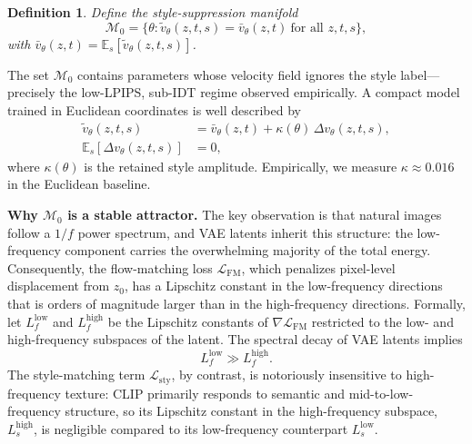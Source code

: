 \documentclass[letterpaper]{article}
\newtheorem{definition}{Definition}
\begin{document}
\begin{definition}
\label{def:attractor}
Define the style-suppression manifold
\begin{equation}
\mathcal M_0 = \{\theta:\tilde v_\theta(z,t,s)=\bar v_\theta(z,t)\ \text{for all } z,t,s\},
\end{equation}
with $\bar v_\theta(z,t)=\mathbb E_s[\tilde v_\theta(z,t,s)]$.
\end{definition}

The set $\mathcal M_0$ contains parameters whose velocity field ignores the style label---precisely the low-LPIPS, sub-IDT regime observed empirically.
A compact model trained in Euclidean coordinates is well described by
\begin{equation}
\begin{aligned}
\tilde v_\theta(z,t,s) &= \bar v_\theta(z,t) + \kappa(\theta)\,\Delta v_\theta(z,t,s),\\
\mathbb E_s[\Delta v_\theta(z,t,s)] &= 0,
\end{aligned}
\label{eq:kappa}
\end{equation}
where $\kappa(\theta)$ is the retained style amplitude.
Empirically, we measure $\kappa\approx0.016$ in the Euclidean baseline.

\textbf{Why $\mathcal M_0$ is a stable attractor.}
The key observation is that natural images follow a $1/f$ power spectrum, and VAE latents inherit this structure: the low-frequency component carries the overwhelming majority of the total energy.
Consequently, the flow-matching loss $\mathcal L_{\mathrm{FM}}$, which penalizes pixel-level displacement from $z_0$, has a Lipschitz constant in the low-frequency directions that is orders of magnitude larger than in the high-frequency directions.
Formally, let $L_f^{\mathrm{low}}$ and $L_f^{\mathrm{high}}$ be the Lipschitz constants of $\nabla\mathcal L_{\mathrm{FM}}$ restricted to the low- and high-frequency subspaces of the latent.
The spectral decay of VAE latents implies
\begin{equation}
L_f^{\mathrm{low}} \gg L_f^{\mathrm{high}}.
\label{eq:lipschitz}
\end{equation}
The style-matching term $\mathcal L_{\mathrm{sty}}$, by contrast, is notoriously insensitive to high-frequency texture: CLIP primarily responds to semantic and mid-to-low-frequency structure, so its Lipschitz constant in the high-frequency subspace, $L_s^{\mathrm{high}}$, is negligible compared to its low-frequency counterpart $L_s^{\mathrm{low}}$.
\end{document}
